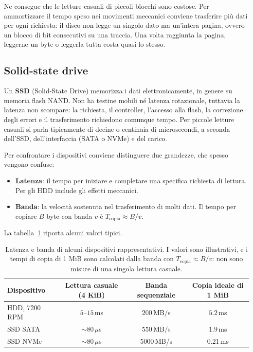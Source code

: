 Ne consegue che le letture casuali di piccoli blocchi sono costose. Per ammortizzare il tempo speso nei movimenti meccanici conviene trasferire più dati per ogni richiesta: il disco non legge un singolo dato ma un'intera pagina, ovvero un blocco di bit consecutivi su una traccia. Una volta raggiunta la pagina, leggerne un byte o leggerla tutta costa quasi lo stesso.

\subsection{Solid-state drive}
Un \textbf{SSD} (Solid-State Drive) memorizza i dati elettronicamente, in genere su memoria flash NAND. Non ha testine mobili né latenza rotazionale, tuttavia la latenza non scompare: la richiesta, il controller, l'accesso alla flash, la correzione degli errori e il trasferimento richiedono comunque tempo. Per piccole letture casuali si parla tipicamente di decine o centinaia di microsecondi, a seconda dell'SSD, dell'interfaccia (SATA o NVMe) e del carico.

Per confrontare i dispositivi conviene distinguere due grandezze, che spesso vengono confuse:
\begin{itemize}
    \item \textbf{Latenza}: il tempo per iniziare e completare una specifica richiesta di lettura. Per gli HDD include gli effetti meccanici.
    \item \textbf{Banda}: la velocità sostenuta nel trasferimento di molti dati. Il tempo per copiare $B$ byte con banda $v$ è $T_{\text{copia}} \approx B/v$.
\end{itemize}
La tabella~\ref{tab:latenza-banda} riporta alcuni valori tipici.

\begin{table}[htbp]
\centering
\small
\begin{tabular}{lccc}
\toprule
Dispositivo & Lettura casuale (4 KiB) & Banda sequenziale & Copia ideale di 1 MiB \\
\midrule
HDD, 7200 RPM & $5$--$15$\,ms & $200$\,MB/s & $5.2$\,ms \\
SSD SATA & $\sim 80\,\mu$s & $550$\,MB/s & $1.9$\,ms \\
SSD NVMe & $\sim 80\,\mu$s & $5000$\,MB/s & $0.21$\,ms \\
\bottomrule
\end{tabular}
\caption{Latenza e banda di alcuni dispositivi rappresentativi. I valori sono illustrativi, e i tempi di copia di 1 MiB sono calcolati dalla banda con $T_{\text{copia}} \approx B/v$: non sono misure di una singola lettura casuale.}
\label{tab:latenza-banda}
\end{table}

